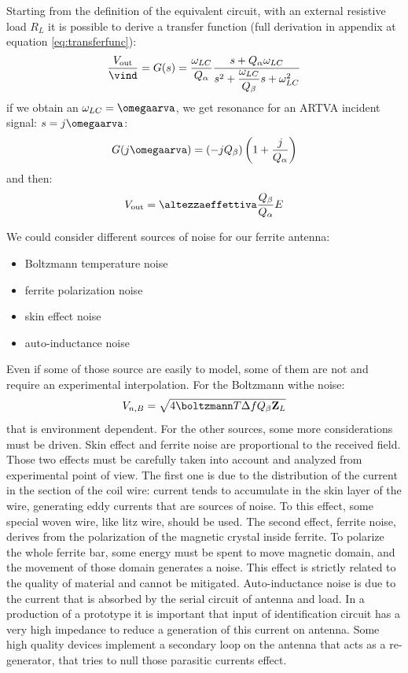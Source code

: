 Starting from the definition of the equivalent circuit, with an external resistive load $R_L$ it is possible to derive a transfer function (full derivation in appendix at equation \ref{eq:transferfunc}):
\begin{equation}
\dfrac{V_{\mathrm{out}}}{\vind} = G(s) = \dfrac{\omega_{LC}}{Q_{\alpha}} \dfrac{s + Q_{\alpha} \omega_{LC}}{s^2 + \dfrac{\omega_{LC}}{Q_{\beta}} s + \omega_{LC}^2}
\end{equation}
if we obtain an $\omega_{LC} = \omegaarva$, we get resonance for an ARTVA incident signal: $s=j\omegaarva$:
\begin{equation}
G(j\omegaarva) = \left( -j Q_{\beta} \right) \left( 1 + \dfrac{j}{Q_{\alpha}} \right)
\end{equation} 
and then:
\begin{equation}
V_{\mathrm{out}} = \altezzaeffettiva \dfrac{Q_{\beta}}{Q_{\alpha}} E
\end{equation}

We could consider different sources of noise for our ferrite antenna:
\begin{itemize}
\item Boltzmann temperature noise
\item ferrite polarization noise
\item skin effect noise
\item auto-inductance noise
\end{itemize}

Even if some of those source are easily to model, some of them are not and require an experimental interpolation. For the Boltzmann withe noise:
\[
V_{n,B} = \sqrt{4 \boltzmann T \Delta f Q_{\beta} \mathbf{Z}_{L}}
\]
that is environment dependent. For the other sources, some more considerations must be driven. Skin effect and ferrite noise are proportional to the received field. 
Those two effects must be carefully taken into account and analyzed from experimental point of view. The first one is due to the distribution of the current in the section of the coil wire: current tends to accumulate in the skin layer of the wire, generating eddy currents that are sources of noise. To this effect, some special woven wire, like litz wire, should be used.
The second effect, ferrite noise, derives from the polarization of the magnetic crystal inside ferrite. To polarize the whole ferrite bar, some energy must be spent to move magnetic domain, and the movement of those domain generates a noise. This effect is strictly related to the quality of material and cannot be mitigated.
Auto-inductance noise is due to the current that is absorbed by the serial circuit of antenna and load. In a production of a prototype it is important that input of identification circuit has a very high impedance to reduce a generation of this current on antenna. Some high quality devices implement a secondary loop on the antenna that acts as a re-generator, that tries to null those parasitic currents effect.

